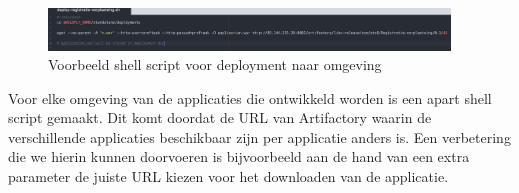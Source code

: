 \begin{figure}[H]
	\centering
	\includegraphics[width=0.95\textwidth]{images/DeploymentScript.png}
	\caption{Voorbeeld shell script voor deployment naar omgeving}
	\label{fig:DeploymentScript}
\end{figure}
Voor elke omgeving van de applicaties die ontwikkeld worden is een apart shell script gemaakt. Dit komt doordat de URL van Artifactory waarin de verschillende applicaties beschikbaar zijn per applicatie anders is. Een verbetering die we hierin kunnen doorvoeren is bijvoorbeeld aan de hand van een extra parameter de juiste URL kiezen voor het downloaden van de applicatie.
